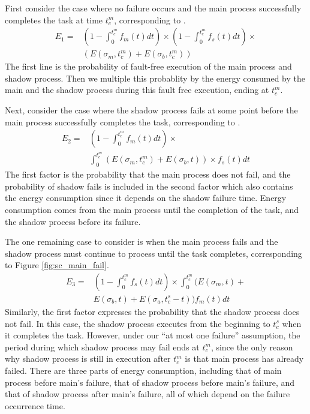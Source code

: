 First consider the case where no failure occurs and the main process
successfully completes the task at time $t_c^m$, corresponding to
.
\begin{equation}
\begin{split}
E_1 = &  ( 1-\int_0^{t_c^m}f_m(t)dt) \times (1 - \int_0^{t_c^m} f_s(t)dt) \times \\
      &  (  E(\sigma_m,t_c^m) + E(\sigma_b,t_c^m))
\label{eq:energy_no_failure}
\end{split}
\end{equation}
The first line is the probability of fault-free execution of the main
process and shadow process. Then we multiple this probablity by the
energy consumed by the main and the shadow process during this fault
free execution, ending at $t_c^m$.

Next, consider the case where the shadow process fails at some point
before the main process successfully completes the task, corresponding to
.
\begin{equation}
\begin{split}
E_2 = & (1-\int_0^{t_c^m}f_m(t)dt) \times \\
      & \int_0^{t_c^m}(E(\sigma_m,t_c^m)+E(\sigma_b,t)) \times f_s(t)dt
\label{eq:energy_shadow_fail}
\end{split}
\end{equation}
The first factor is the probability that the main process does not
fail, and the probability of shadow fails is included in the second factor which also contains the energy consumption since it depends on the shadow failure time. Energy consumption comes from the main process until the completion of the task,
and the shadow process before its failure.

The one remaining case to consider is when the main process fails and
the shadow process must continue to process until the task completes,
corresponding to Figure \ref{fig:sc_main_fail}.
\begin{equation}
\begin{split}
E_3 = & (1-\int_0^{t_c^m}f_s(t)dt) \times \int_0^{t_c^m}(E(\sigma_m,t)+\\
      & E(\sigma_b,t)+E(\sigma_a,t_c^s-t))f_m(t)dt
\label{eq:energy_main_fail}
\end{split}
\end{equation}
Similarly, the first factor expresses the probability that the shadow process does
not fail. In this case, the shadow process executes from the beginning to
$t_c^s$ when it completes the task. However, under our ``at most one
failure'' assumption, the period during which shadow process may fail
ends at $t_c^m$, since the only reason why shadow process is still in
execution after $t_c^m$ is that main process has already failed. There
are three parts of energy consumption, including that of main process
before main's failure, that of shadow process before main's failure,
and that of shadow process after main's failure, all of which depend
on the failure occurrence time. 

